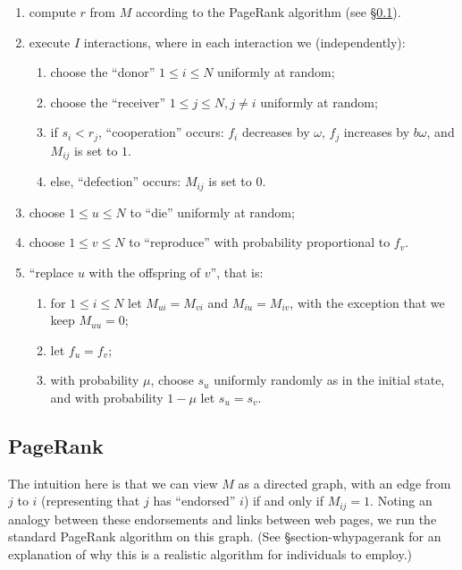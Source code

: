 \documentclass{amsart}
\begin{document}
\begin{enumerate}
\item compute $r$ from $M$ according to the PageRank algorithm
  (see \S\ref{subsection-pagerank}).
\item execute $I$ interactions, where in each interaction we
  (independently):
  \begin{enumerate}
  \item choose the ``donor'' $1 \le i \le N$ uniformly at random;
  \item choose the ``receiver'' $1 \le j \le N, j \ne i$ uniformly at
    random;
  \item if $s_i < r_j$, ``cooperation'' occurs: $f_i$ decreases by
    $\omega$, $f_j$ increases by $b\omega$, and $M_{ij}$ is set to
    $1$.
  \item else, ``defection'' occurs: $M_{ij}$ is set to $0$.
  \end{enumerate}
\item choose $1 \le u \le N$ to ``die'' uniformly at random;
\item choose $1 \le v \le N$ to ``reproduce'' with probability
  proportional to $f_v$.
\item ``replace $u$ with the offspring of $v$'', that is:
  \begin{enumerate}
  \item for $1 \le i \le N$ let $M_{ui} = M_{vi}$ and $M_{iu} =
    M_{iv}$, with the exception that we keep $M_{uu} = 0$;
  \item let $f_u = f_v$;
  \item with probability $\mu$, choose $s_u$ uniformly randomly as in
    the initial state, and with probability $1-\mu$ let $s_u = s_v$.
  \end{enumerate}
\end{enumerate}

\subsection{PageRank}
\label{subsection-pagerank}

The intuition here is that we can view $M$ as a directed graph, with
an edge from $j$ to $i$ (representing that $j$ has ``endorsed'' $i$)
if and only if $M_{ij} = 1$. Noting an analogy between these
endorsements and links between web pages, we run the standard PageRank
algorithm \cite{page_pagerank_1999} on this graph. (See
\S{section-whypagerank} for an explanation of why this is a realistic
algorithm for individuals to employ.)
\end{document}
